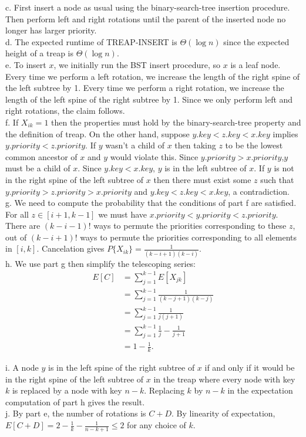 \documentclass{article}
\begin{document}
c. First insert a node as usual using the binary-search-tree insertion procedure.  Then perform left and right rotations until the parent of the inserted node no longer has larger priority. \\

d. The expected runtime of TREAP-INSERT is $\Theta(\log n)$ since the expected height of a treap is $\Theta(\log n)$.\\

e. To insert $x$, we initially run the BST insert procedure, so $x$ is a leaf node.  Every time we perform a left rotation, we increase the length of the right spine of the left subtree by 1.  Every time we perform a right rotation, we increase the length of the left spine of the right subtree by 1. Since we only perform left and right rotations, the claim follows. \\

f. If $X_{ik} = 1$ then the properties must hold by the binary-search-tree property and the definition of treap.  On the other hand, suppose $y.key < z.key < x.key$ implies $y.priority < z.priority$.  If $y$ wasn't a child of $x$ then taking $z$ to be the lowest common ancestor of $x$ and $y$ would violate this.  Since $y.priority > x.priority$,$y$ must be a child of $x$.  Since $y.key < x.key$, $y$ is in the left subtree of $x$.  If $y$ is not in the right spine of the left subtree of $x$ then there must exist some $z$ such that $y.priority > z.priority > x.priority$ and $y.key < z.key <x.key$, a contradiction. \\

g. We need to compute the probability that the conditions of part f are satisfied. For all $z \in [i+1, k-1]$ we must have $x.priority < y.priority < z.priority$.  There are $(k-i-1)!$ ways to permute the priorities corresponding to these $z$, out of $(k-i+1)!$ ways to permute the priorities corresponding to all elements in $[i,k]$.  Cancelation gives $P\{X_{ik}\} = \frac{1}{(k-i+1)(k-i)}$. \\

h. We use part g then simplify the telescoping series:
\begin{align*}
E[C] &= \sum_{j=1}^{k-1} E[X_{jk}] \\
&= \sum_{j=1}^{k-1} \frac{1}{(k-j+1)(k-j)}\\
&= \sum_{j=1}^{k-1}\frac{1}{j(j+1)} \\
&= \sum_{j=1}^{k-1}\frac{1}{j} - \frac{1}{j+1} \\
&= 1 - \frac{1}{k}.
\end{align*}

i. A node $y$ is in the left spine of the right subtree of $x$ if and only if it would be in the right spine of the left subtree of $x$ in the treap where every node with key $k$ is replaced by a node with key $n-k$.  Replacing $k$ by $n-k$ in the expectation computation of part h gives the result. \\

j.  By part e, the number of rotations is $C + D$.  By linearity of expectation, $E[C+D] = 2 - \frac{1}{k} - \frac{1}{n-k+1} \leq 2$ for any choice of $k$.
\end{document}
